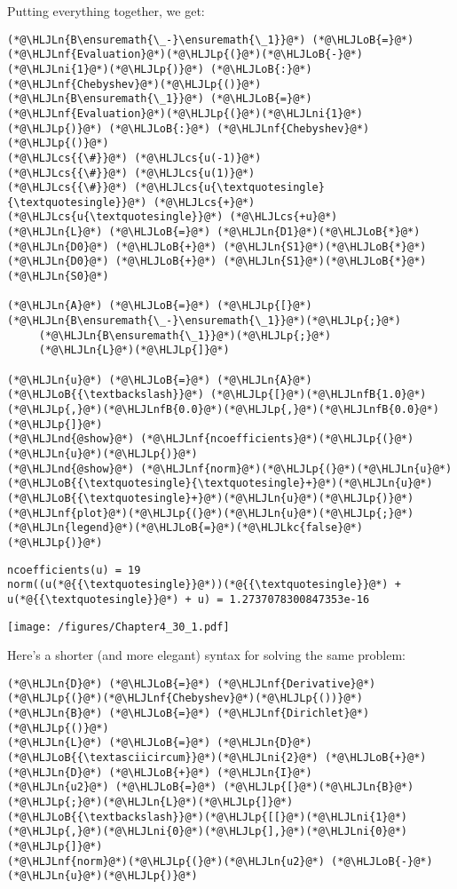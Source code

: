 \documentclass[12pt,landscape]{article}
\newcommand{\HLJLkc}[1]{\textcolor[RGB]{59,151,46}{\textit{#1}}}
\newcommand{\HLJLn}[1]{#1}
\newcommand{\HLJLnd}[1]{\textcolor[RGB]{214,102,97}{#1}}
\newcommand{\HLJLnf}[1]{\textcolor[RGB]{66,102,213}{#1}}
\newcommand{\HLJLnfB}[1]{\textcolor[RGB]{59,151,46}{#1}}
\newcommand{\HLJLni}[1]{\textcolor[RGB]{59,151,46}{#1}}
\newcommand{\HLJLoB}[1]{\textcolor[RGB]{102,102,102}{\textbf{#1}}}
\newcommand{\HLJLp}[1]{#1}
\newcommand{\HLJLcs}[1]{\textcolor[RGB]{153,153,119}{\textit{#1}}}
\begin{document}
{Putting everything together, we get:


\begin{lstlisting}
(*@\HLJLn{B\ensuremath{\_-}\ensuremath{\_1}}@*) (*@\HLJLoB{=}@*) (*@\HLJLnf{Evaluation}@*)(*@\HLJLp{(}@*)(*@\HLJLoB{-}@*)(*@\HLJLni{1}@*)(*@\HLJLp{)}@*) (*@\HLJLoB{:}@*) (*@\HLJLnf{Chebyshev}@*)(*@\HLJLp{()}@*)
(*@\HLJLn{B\ensuremath{\_1}}@*) (*@\HLJLoB{=}@*) (*@\HLJLnf{Evaluation}@*)(*@\HLJLp{(}@*)(*@\HLJLni{1}@*)(*@\HLJLp{)}@*) (*@\HLJLoB{:}@*) (*@\HLJLnf{Chebyshev}@*)(*@\HLJLp{()}@*)
(*@\HLJLcs{{\#}}@*) (*@\HLJLcs{u(-1)}@*)
(*@\HLJLcs{{\#}}@*) (*@\HLJLcs{u(1)}@*)
(*@\HLJLcs{{\#}}@*) (*@\HLJLcs{u{\textquotesingle}{\textquotesingle}}@*) (*@\HLJLcs{+}@*) (*@\HLJLcs{u{\textquotesingle}}@*) (*@\HLJLcs{+u}@*)
(*@\HLJLn{L}@*) (*@\HLJLoB{=}@*) (*@\HLJLn{D1}@*)(*@\HLJLoB{*}@*)(*@\HLJLn{D0}@*) (*@\HLJLoB{+}@*) (*@\HLJLn{S1}@*)(*@\HLJLoB{*}@*)(*@\HLJLn{D0}@*) (*@\HLJLoB{+}@*) (*@\HLJLn{S1}@*)(*@\HLJLoB{*}@*)(*@\HLJLn{S0}@*)

(*@\HLJLn{A}@*) (*@\HLJLoB{=}@*) (*@\HLJLp{[}@*)(*@\HLJLn{B\ensuremath{\_-}\ensuremath{\_1}}@*)(*@\HLJLp{;}@*)
     (*@\HLJLn{B\ensuremath{\_1}}@*)(*@\HLJLp{;}@*)
     (*@\HLJLn{L}@*)(*@\HLJLp{]}@*)

(*@\HLJLn{u}@*) (*@\HLJLoB{=}@*) (*@\HLJLn{A}@*) (*@\HLJLoB{{\textbackslash}}@*) (*@\HLJLp{[}@*)(*@\HLJLnfB{1.0}@*)(*@\HLJLp{,}@*)(*@\HLJLnfB{0.0}@*)(*@\HLJLp{,}@*)(*@\HLJLnfB{0.0}@*)(*@\HLJLp{]}@*)
(*@\HLJLnd{@show}@*) (*@\HLJLnf{ncoefficients}@*)(*@\HLJLp{(}@*)(*@\HLJLn{u}@*)(*@\HLJLp{)}@*)
(*@\HLJLnd{@show}@*) (*@\HLJLnf{norm}@*)(*@\HLJLp{(}@*)(*@\HLJLn{u}@*)(*@\HLJLoB{{\textquotesingle}{\textquotesingle}+}@*)(*@\HLJLn{u}@*)(*@\HLJLoB{{\textquotesingle}+}@*)(*@\HLJLn{u}@*)(*@\HLJLp{)}@*)
(*@\HLJLnf{plot}@*)(*@\HLJLp{(}@*)(*@\HLJLn{u}@*)(*@\HLJLp{;}@*)(*@\HLJLn{legend}@*)(*@\HLJLoB{=}@*)(*@\HLJLkc{false}@*)(*@\HLJLp{)}@*)
\end{lstlisting}

\begin{lstlisting}
ncoefficients(u) = 19
norm((u(*@{{\textquotesingle}}@*))(*@{{\textquotesingle}}@*) + u(*@{{\textquotesingle}}@*) + u) = 1.2737078300847353e-16
\end{lstlisting}

\texttt{[image: /figures/Chapter4\_30\_1.pdf]}

Here's a shorter (and more elegant) syntax for solving the same problem:


\begin{lstlisting}
(*@\HLJLn{D}@*) (*@\HLJLoB{=}@*) (*@\HLJLnf{Derivative}@*)(*@\HLJLp{(}@*)(*@\HLJLnf{Chebyshev}@*)(*@\HLJLp{())}@*)
(*@\HLJLn{B}@*) (*@\HLJLoB{=}@*) (*@\HLJLnf{Dirichlet}@*)(*@\HLJLp{()}@*)
(*@\HLJLn{L}@*) (*@\HLJLoB{=}@*) (*@\HLJLn{D}@*)(*@\HLJLoB{{\textasciicircum}}@*)(*@\HLJLni{2}@*) (*@\HLJLoB{+}@*) (*@\HLJLn{D}@*) (*@\HLJLoB{+}@*) (*@\HLJLn{I}@*)
(*@\HLJLn{u2}@*) (*@\HLJLoB{=}@*) (*@\HLJLp{[}@*)(*@\HLJLn{B}@*)(*@\HLJLp{;}@*)(*@\HLJLn{L}@*)(*@\HLJLp{]}@*)(*@\HLJLoB{{\textbackslash}}@*)(*@\HLJLp{[[}@*)(*@\HLJLni{1}@*)(*@\HLJLp{,}@*)(*@\HLJLni{0}@*)(*@\HLJLp{],}@*)(*@\HLJLni{0}@*)(*@\HLJLp{]}@*)
(*@\HLJLnf{norm}@*)(*@\HLJLp{(}@*)(*@\HLJLn{u2}@*) (*@\HLJLoB{-}@*) (*@\HLJLn{u}@*)(*@\HLJLp{)}@*)
\end{lstlisting}

}
\end{document}

